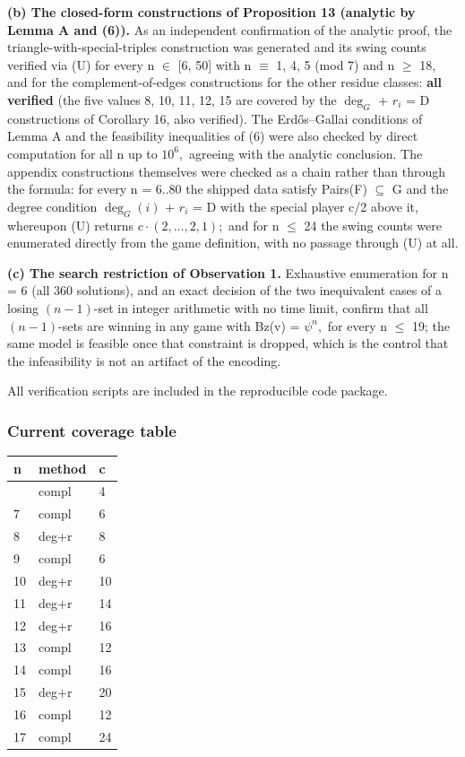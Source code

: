 \documentclass[
]{article}
\begin{document}
\textbf{(b) The closed-form constructions of Proposition 13 (analytic by
Lemma A and (6)).} As an independent confirmation of the analytic proof,
the triangle-with-special-triples construction was generated and its
swing counts verified via (U) for every n \(\in\) {[}6, 50{]} with n
\(\equiv\) 1, 4, 5 (mod 7) and n \(\ge\) 18, and for the
complement-of-edges constructions for the other residue classes:
\textbf{all verified} (the five values 8, 10, 11, 12, 15 are covered by
the \(\deg_G\) + \(r_i\) = D constructions of Corollary 16, also
verified). The Erdős--Gallai conditions of Lemma A and the feasibility
inequalities of (6) were also checked by direct computation for all n up
to \(10^6,\) agreeing with the analytic conclusion. The appendix
constructions themselves were checked as a chain rather than through the
formula: for every n = 6..80 the shipped data satisfy Pairs(F)
\(\subseteq\) G and the degree condition \(\deg_G(i)\) + \(r_i\) = D
with the special player c/2 above it, whereupon (U) returns
\(c\cdot(2,\dots,2,1);\) and for n \(\le\) 24 the swing counts were
enumerated directly from the game definition, with no passage through
(U) at all.

\textbf{(c) The search restriction of Observation 1.} Exhaustive
enumeration for n = 6 (all 360 solutions), and an exact decision of the
two inequivalent cases of a losing \((n-1)\)-set in integer arithmetic
with no time limit, confirm that all \((n-1)\)-sets are winning in any
game with Bz(v) = \(\psi^n,\) for every n \(\le\) 19; the same model is
feasible once that constraint is dropped, which is the control that the
infeasibility is not an artifact of the encoding.

All verification scripts are included in the reproducible code package.

\subsubsection{Current coverage table}\label{current-coverage-table}

\begin{longtable}[]{@{}lll@{}}
\toprule\noalign{}
n & method & c \\
\midrule\noalign{}
\endhead
\bottomrule\noalign{}
\endlastfoot
6 & compl & 4 \\
7 & compl & 6 \\
8 & deg+r & 8 \\
9 & compl & 6 \\
10 & deg+r & 10 \\
11 & deg+r & 14 \\
12 & deg+r & 16 \\
13 & compl & 12 \\
14 & compl & 16 \\
15 & deg+r & 20 \\
16 & compl & 12 \\
17 & compl & 24 \\
\end{longtable}
\end{document}
